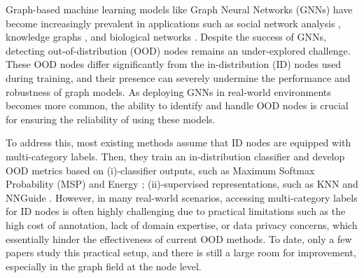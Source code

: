 Graph-based machine learning models like Graph Neural Networks (GNNs) \citep{kipf2016semi,xu2018representation,abu2019mixhop} have become increasingly prevalent in applications such as social network analysis \citep{fan2019graph}, knowledge graphs \citep{baek2020learning},  and biological networks \citep{de2018molgan}. Despite the success of GNNs, detecting out-of-distribution (OOD) nodes remains an under-explored challenge. These OOD nodes differ significantly from the in-distribution (ID) nodes used during training, and their presence can severely undermine the performance and robustness of graph models. As deploying GNNs in real-world environments becomes more common, the ability to identify and handle OOD nodes is crucial for ensuring the reliability of using these models.

To address this, most existing methods \citep{hendrycks2016baseline, liang2017enhancing, hendrycks2018deep,liu2020energy,wu2023energy} assume that ID nodes are equipped with multi-category labels.
Then, they train an in-distribution classifier and develop OOD metrics based on (i)-classifier outputs, such as Maximum Softmax Probability (MSP) \citep{hendrycks2016baseline} and Energy \citep{liu2020energy, wu2023energy}; (ii)-supervised representations, such as KNN \citep{sun2022out} and NNGuide \citep{park2023nearest}.
However, in many real-world scenarios, accessing multi-category labels for ID nodes is often highly challenging due to practical limitations such as the high cost of annotation, lack of domain expertise, or data privacy concerns, which essentially hinder the effectiveness of current OOD methods. 
To date, only a few papers \cite{gong2024energy, sun2022out, sehwag2021ssd, liu2023good} study this practical setup, and there is still a large room for improvement, especially in the graph field at the node level.


